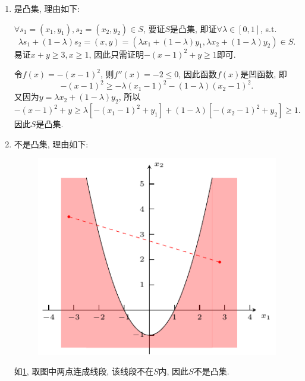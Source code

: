 \begin{enumerate}[label=\alph*)]
    \item
        是凸集, 理由如下:

        $\forall s_1=(x_1,y_1),s_2=(x_2,y_2)\in S$, 要证$S$是凸集, 即证$\forall\lambda\in[0,1]$, s.t.
        \begin{equation*}
            \lambda s_1+(1-\lambda)s_2
            =(x,y)
            =(\lambda x_1+(1-\lambda)y_1, \lambda x_2+(1-\lambda)y_2)
            \in S.
        \end{equation*}
        易证$x+y\geq3, x\geq1$, 因此只需证明$-(x-1)^2+y\geq1$即可.

        令$f(x)=-(x-1)^2$, 则$f''(x)=-2\leq0$, 因此函数$f(x)$是凹函数, 即
        \begin{equation*}
            -(x-1)^2\geq -\lambda(x_1-1)^2-(1-\lambda)(x_2-1)^2.
        \end{equation*}
        又因为$y=\lambda x_2+(1-\lambda)y_2$, 所以
        \begin{equation*}
            -(x-1)^2+y\geq \lambda[-(x_1-1)^2+y_1]+(1-\lambda)[-(x_2-1)^2+y_2]\geq1.
        \end{equation*}
        因此$S$是凸集.

    \item
        不是凸集, 理由如下:

        \begin{figure}[ht]
            \centering
            \includegraphics[scale=1.2]{figures/2d.pdf}
            \caption{}
            \label{figure:2d}
        \end{figure}
        如\cref{figure:2d}, 取图中两点连成线段, 该线段不在$S$内, 因此$S$不是凸集.
\end{enumerate}
